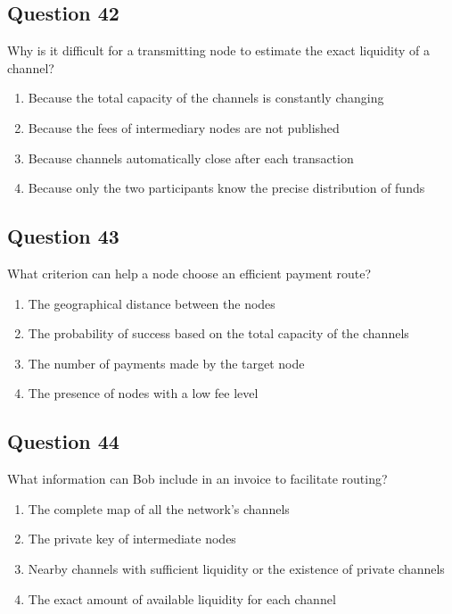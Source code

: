 \documentclass[12pt,a4paper]{article}
\begin{document}
\bigskip


\subsection*{Question 42}
Why is it difficult for a transmitting node to estimate the exact liquidity of a channel?

\begin{enumerate}[label=\Alph*., leftmargin=*]
\item Because the total capacity of the channels is constantly changing
\item Because the fees of intermediary nodes are not published
\item Because channels automatically close after each transaction
\item Because only the two participants know the precise distribution of funds
\end{enumerate}

\bigskip


\subsection*{Question 43}
What criterion can help a node choose an efficient payment route?

\begin{enumerate}[label=\Alph*., leftmargin=*]
\item The geographical distance between the nodes
\item The probability of success based on the total capacity of the channels
\item The number of payments made by the target node
\item The presence of nodes with a low fee level
\end{enumerate}

\bigskip


\subsection*{Question 44}
What information can Bob include in an invoice to facilitate routing?

\begin{enumerate}[label=\Alph*., leftmargin=*]
\item The complete map of all the network's channels
\item The private key of intermediate nodes
\item Nearby channels with sufficient liquidity or the existence of private channels
\item The exact amount of available liquidity for each channel
\end{enumerate}
\end{document}
